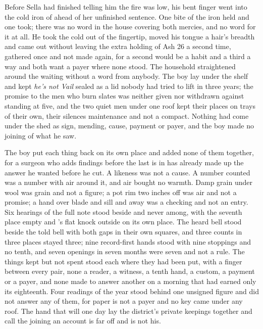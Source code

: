 Before Sella had finished telling him the fire was low, his bent finger went into the cold iron of  ahead of her unfinished sentence. One bite of the iron held and one took; there was no word in the house covering both mercies, and no  word for it at all. He took the cold out of the fingertip, moved his tongue a hair's breadth and came out without leaving the extra holding of Ash 26 a second time, gathered once and not made again, for a second would be a habit and a third a way and both want a payer where none stood. The household straightened around the waiting without a word from anybody. The boy lay under the shelf and kept \emph{he's not Vail} sealed as a lid nobody had tried to lift in three years; the promise to the men who burn slates was neither given nor withdrawn against  standing at five, and the two quiet men under one roof kept their places on trays of their own, their silences maintenance and not a compact. Nothing had come under the shed as sign, mending, cause, payment or payer, and the boy made no joining of what he saw.

\scenebreak

The boy put each thing back on its own place and added none of them together, for a surgeon who adds findings before the last is in has already made up the answer he wanted before he cut. A likeness was not a cause. A number counted was a number with air around it, and air bought no warmth. Damp grain under wool was grain and not a figure; a pot rim two inches off was air and not a promise; a hand over blade and sill and away was a checking and not an entry. Six hearings of the full note stood beside and never among, with the seventh place empty and 's flat knock outside on its own place. The heard bell stood beside the told bell with both gaps in their own squares, and three counts in three places stayed three; nine record-first hands stood with nine stoppings and no tenth, and seven openings in seven months were seven and not a rule. The things kept but not spent stood each where they had been put, with a finger between every pair, none a reader, a witness, a tenth hand, a custom, a payment or a payer, and none made to answer another on a morning that had earned only its eighteenth. Four readings of the year stood behind one unsigned figure and did not answer any of them, for paper is not a payer and no key came under any roof. The hand that will one day lay the district's private keepings together and call the joining an account is far off and is not his.

